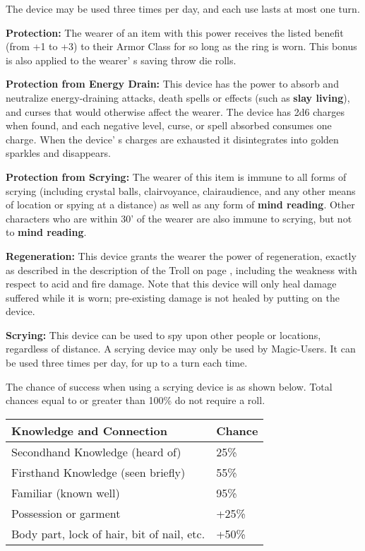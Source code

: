 \documentclass[a4paper,twoside,openany,10pt]{book}
\begin{document}
\begin{multicols}{2}
The device may be used three times per day, and each use lasts at most one turn.

\textbf{Protection:} The wearer of an item with this power receives the listed benefit (from +1 to +3) to their Armor Class for so long as the ring is worn. This bonus is also applied to the wearer' s saving throw die rolls.

\textbf{Protection from Energy Drain:} This device has the power to absorb and neutralize energy-draining attacks, death spells or effects (such as \textbf{slay living}), and curses that would otherwise affect the wearer. The device has 2d6 charges when found, and each negative level, curse, or spell absorbed consumes one charge\emph{.} When the device' s charges are exhausted it disintegrates into golden sparkles and disappears.

\textbf{Protection from Scrying:} The wearer of this item is immune to all forms of scrying (including crystal balls, clairvoyance, clairaudience, and any other means of location or spying at a distance) as well as any form of \textbf{mind reading}. Other characters who are within 30' of the wearer are also immune to scrying, but not to \textbf{mind reading}.

\textbf{Regeneration:} This device grants the wearer the power of regeneration, exactly as described in the description of the Troll on page \hyperlink{troll-and-trollwife}{\pageref{troll-and-trollwife}}, including the weakness with respect to acid and fire damage. Note that this device will only heal damage suffered while it is worn; pre-existing damage is not healed by putting on the device.

\textbf{Scrying:} This device can be used to spy upon other people or locations, regardless of distance. A scrying device may only be used by Magic-Users. It can be used three times per day, for up to a turn each time.

The chance of success when using a scrying device is as shown below. Total chances equal to or greater than 100\% do not require a roll.\medskip

\begin{tabular*}{0.93\linewidth}{@{\extracolsep{\fill}}ll}
Knowledge and Connection & Chance \\\toprule
Secondhand Knowledge (heard of) & 25\% \\\hline
Firsthand Knowledge (seen briefly) & 55\% \\\hline
Familiar (known well) & 95\% \\\hline
Possession or garment & +25\% \\\hline
Body part, lock of hair, bit of nail, etc. & +50\% \\\bottomrule
\end{tabular*}\medskip


\end{multicols}
\end{document}
